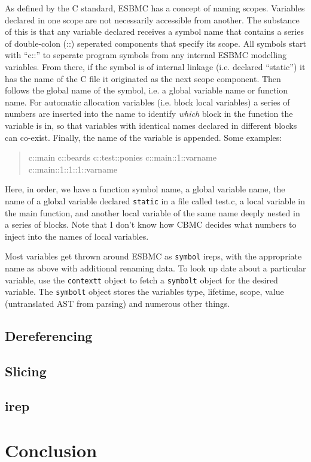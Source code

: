 \documentclass{article}
\begin{document}
As defined by the C standard, ESBMC has a concept of naming scopes. Variables
declared in one scope are not necessarily accessible from another. The substance
of this is that any variable declared receives a symbol name that contains
a series of double-colon (::) seperated components that specify its scope. All
symbols start with ``c::'' to seperate program symbols from any internal
ESBMC modelling variables. From there, if the symbol is of internal linkage
(i.e. declared ``static'') it has the name of the C file it originated as
the next scope component. Then follows the global name of the symbol, i.e.
a global variable name or function name. For automatic allocation variables
(i.e. block local variables) a series of numbers are inserted into the
name to identify \textit{which} block in the function the variable is in, so
that variables with identical names declared in different blocks can co-exist.
Finally, the name of the variable is appended. Some examples:

\begin{quote}
c::main
c::beards
c::test::ponies
c::main::1::varname
c::main::1::1::1::varname
\end{quote}

Here, in order, we have a function symbol name, a global variable name,
the name of a global variable declared \texttt{static} in a file called test.c,
a local variable in the main function, and another local variable of the same
name deeply nested in a series of blocks. Note that I don't know how CBMC
decides what numbers to inject into the names of local variables.

Most variables get thrown around ESBMC as \texttt{symbol} ireps, with the
appropriate name as above with additional renaming data. To look up date about
a particular variable, use the \texttt{contextt} object to fetch a
\texttt{symbolt} object for the desired variable. The \texttt{symbolt} object
stores the variables type, lifetime, scope, value (untranslated AST from
parsing) and numerous other things.

\subsection{Dereferencing}
\subsection{Slicing}
\subsection{irep}
\section{Conclusion}
\end{document}
